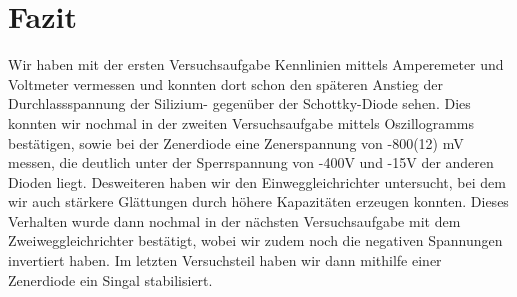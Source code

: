 \documentclass[a4paper,10pt]{article}
\numberwithin{equation}{section}
\begin{document}
\section{Fazit}
Wir haben mit der ersten Versuchsaufgabe Kennlinien mittels Amperemeter und Voltmeter vermessen und konnten dort schon den späteren Anstieg der Durchlassspannung der Silizium- gegenüber der Schottky-Diode sehen. Dies konnten wir nochmal in der zweiten Versuchsaufgabe mittels Oszillogramms bestätigen, sowie bei der Zenerdiode eine Zenerspannung von -800(12) mV messen, die deutlich unter der Sperrspannung von -400V und -15V der anderen Dioden liegt. Desweiteren haben wir den Einweggleichrichter untersucht, bei dem wir auch stärkere Glättungen durch höhere Kapazitäten erzeugen konnten. Dieses Verhalten wurde dann nochmal in der nächsten Versuchsaufgabe mit dem Zweiweggleichrichter bestätigt, wobei wir zudem noch die negativen Spannungen invertiert haben. Im letzten Versuchsteil haben wir dann mithilfe einer Zenerdiode ein Singal stabilisiert.
 
\clearpage
\listoffigures
\listoftables



\clearpage
\end{document}

